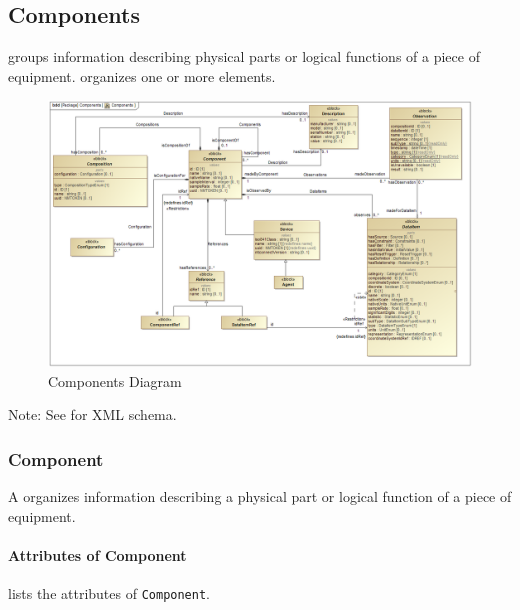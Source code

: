 \subsection{Components} \label{sec:Components}


 groups information describing physical parts or logical functions of a piece of equipment.    \glspl{organize} one or more  elements. 

\begin{figure}[ht]
  \centering
    \includegraphics[width=1.0\textwidth]{figures/Components.png}
  \caption{Components Diagram}
  \label{fig:Components Diagram}
\end{figure}

\FloatBarrier


Note: See  for XML schema.


\subsubsection{Component}
\label{sec:Component}



A  organizes information describing a physical part or logical function of a piece of equipment.


\paragraph{Attributes of Component}\mbox{}
\label{sec:Attributes of Component}

 lists the attributes of \texttt{Component}.

